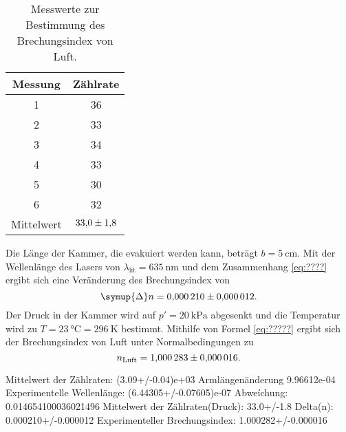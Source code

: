 \begin{table} [H]
    \centering
    \caption{Messwerte zur Bestimmung des Brechungsindex von Luft.}
    \label{tab:Brechungsindex}
    \begin{tabular}{S S}
      \toprule
      {Messung} & {Zählrate} \\
        & 36 \\
      2  & 33 \\
      3  & 34 \\
      4  & 33 \\
      5  & 30 \\
      6  & 32 \\
      \midrule
      {Mittelwert} & $\num{33.0+-1.8}$ \\  
      \bottomrule
    \end{tabular}
\end{table}

Die Länge der Kammer, die evakuiert werden kann, beträgt $b = \qty{5}{\centi\metre}$. Mit der Wellenlänge des Lasers von
$\lambda_{\text{lit}}=\qty{635}{\nano\metre}$ und dem Zusammenhang \eqref{eq:????} ergibt sich eine Veränderung des 
Brechungsindex von
\begin{equation*}
    \symup{\Delta}n = \num{0.000210+-0.000012}.
\end{equation*}
Der Druck in der Kammer wird auf $p'=\qty{20}{\kilo\pascal}$ abgesenkt und die Temperatur wird zu 
$T=\qty{23}{\celsius}=\qty{296}{\kelvin}$ bestimmt.
Mithilfe von Formel \eqref{eq:?????} ergibt sich der Brechungsindex von Luft unter Normalbedingungen zu 
\begin{equation*}
    n_\text{Luft} = \num{1.000283+-0.000016}.
\end{equation*}

Mittelwert der Zählraten:  (3.09+/-0.04)e+03
Armlängenänderung 9.96612e-04
Experimentelle Wellenlänge:  (6.44305+/-0.07605)e-07
Abweíchung:                  0.014654100036021496
Mittelwert der Zählraten(Druck):  33.0+/-1.8
Delta(n):                         0.000210+/-0.000012
Experimenteller Brechungsindex:  1.000282+/-0.000016